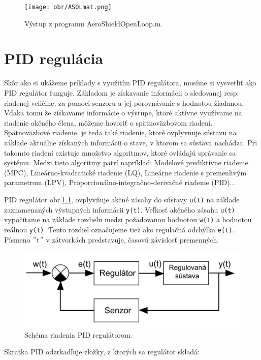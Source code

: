 \begin{figure}[!tbh]
	\centering
	\texttt{[image: obr/ASOLmat.png]}
	\caption{Výstup z programu AeroShieldOpenLoop.m.}\label{OBRAZOK 3.2}
\end{figure}


\chapter{PID regulácia}

Skôr ako si ukážeme príklady s využitím PID regulátora, musíme si vysvetliť ako PID regulátor funguje. Základom je získavanie informácii o sledovanej resp. riadenej veličine, za pomoci senzoru a jej porovnávanie s hodnotou žiadanou. Vďaka tomu že získavame informácie o výstupe, ktoré aktívne využívame na riadenie akčného člena, môžeme hovoriť o spätnoväzbovom riadení. Spätnoväzbové riadenie, je teda také riadenie, ktoré ovplyvnuje sústavu na základe aktuálne získaných informácii o stave, v ktorom sa sústava nachádza. Pri takomto riadení existuje množstvo algoritmov, ktoré ovládajú správanie sa systému. Medzi tieto algoritmy patrí napríklad: Modelové prediktívne riadenie (MPC), Lineárno-kvadratické riadenie (LQ), Lineárne riadenie s premenlivým parametrom (LPV), Proporcionálno-integračno-derivačné riadenie (PID)...

PID regulátor obr.\ref{OBRAZOK 3.3}, ovplyvňuje akčné zásahy do sústavy \verb|u(t)| na základe zaznamenaných výstupných informácii \verb|y(t)|. Veľkosť akčného zásahu \verb|u(t)| vypočítame na základe rozdielu medzi požadovanou hodnotou \verb|w(t)| a hodnotou reálnou \verb|y(t)|. Tento rozdiel označujeme tiež ako regulačná odchýlka \verb|e(t)|. Písmeno $"$t$"$ v zátvorkách predstavuje, časovú závislosť premenných. 

\begin{figure}[!tbh]
	\centering
	\includegraphics[width=120mm]{obr/pid.jpg}
	\caption{Schéma riadenia PID regulátorom.}\label{OBRAZOK 3.3}
\end{figure}

Skratka PID odzrkadľuje zložky, z ktorých sa regulátor skladá: 


